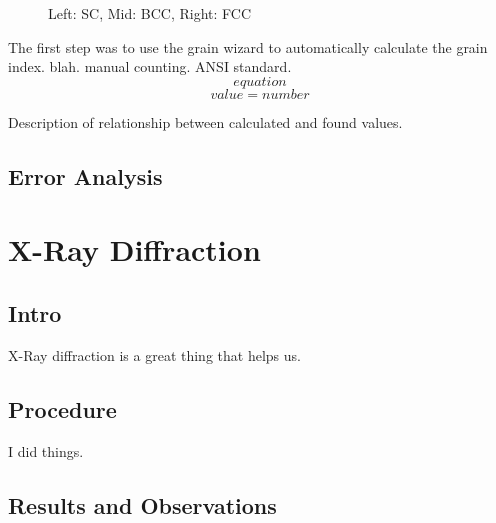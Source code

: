 \documentclass{article}
\begin{document}
\begin{figure}[h]
\begin{minipage}{0.32\textwidth}
	\end{minipage}
	\caption{Left: SC, Mid: BCC, Right: FCC}
\end{figure}

The first step was to use the grain wizard to automatically calculate the grain index. blah. manual counting. ANSI standard.
$$equation$$
$$value = number$$

Description of relationship between calculated and found values.

\subsection{Error Analysis}

\section{X-Ray Diffraction}

\subsection{Intro}

X-Ray diffraction is a great thing that helps us.

\subsection{Procedure}

I did things.

\subsection{Results and Observations}
\end{document}
